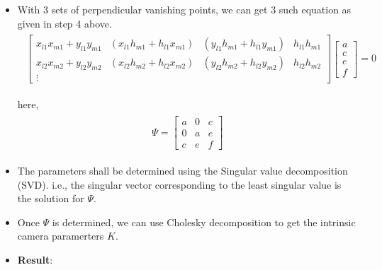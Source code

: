 \documentclass[fleqn]{article}
\begin{document}
\begin{itemize}
  \item With 3 sets of perpendicular vanishing points, we can get 3 such equation as given in step 4 above.
  \begin{eqnarray*}
  \begin{aligned}
  \begin{bmatrix}
  x_{l1}x_{m1} + y_{l1}y_{m1} & (x_{l1}h_{m1} + h_{l1}x_{m1}) & (y_{l1}h_{m1} + h_{l1}y_{m1}) & h_{l1}h_{m1}\\
  x_{l2}x_{m2} + y_{l2}y_{m2} & (x_{l2}h_{m2} + h_{l2}x_{m2})  & (y_{l2}h_{m2} + h_{l2}y_{m2}) & h_{l2}h_{m2}\\
  \vdots
  \end{bmatrix}
  \begin{bmatrix}
  a \\ c\\ e\\ f
  \end{bmatrix} = 0
  \end{aligned}
  \end{eqnarray*}
 
  here, 
  \begin{eqnarray*}
  \begin{aligned}
  \Psi = \begin{bmatrix}
   		a & 0 & c \\
   		0 & a & e \\
   		c & e & f
   \end{bmatrix}
  \end{aligned}
  \end{eqnarray*}
  \item The parameters shall be determined using the Singular value decomposition (SVD). i.e., the singular vector corresponding to the least singular
  value is the solution for $\Psi$.
  \item Once $\Psi$ is determined, we can use Cholesky decomposition to get the intrinsic camera paramerters $K$. 

\item \textbf{Result}:


\end{itemize}
\end{document}
